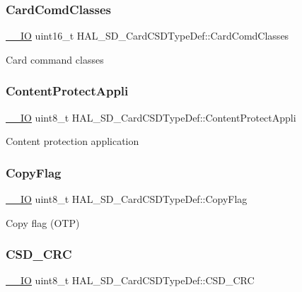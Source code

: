 \subsubsection{\texorpdfstring{CardComdClasses}{CardComdClasses}}
{\footnotesize\ttfamily \mbox{\hyperlink{core__sc300_8h_aec43007d9998a0a0e01faede4133d6be}{\+\_\+\+\_\+\+IO}} uint16\+\_\+t H\+A\+L\+\_\+\+S\+D\+\_\+\+Card\+C\+S\+D\+Type\+Def\+::\+Card\+Comd\+Classes}

Card command classes \mbox{\label{struct_h_a_l___s_d___card_c_s_d_type_def_a6bacd6337e20ac7647c6f1996ae1581f}} 
\subsubsection{\texorpdfstring{ContentProtectAppli}{ContentProtectAppli}}
{\footnotesize\ttfamily \mbox{\hyperlink{core__sc300_8h_aec43007d9998a0a0e01faede4133d6be}{\+\_\+\+\_\+\+IO}} uint8\+\_\+t H\+A\+L\+\_\+\+S\+D\+\_\+\+Card\+C\+S\+D\+Type\+Def\+::\+Content\+Protect\+Appli}

Content protection application \mbox{\label{struct_h_a_l___s_d___card_c_s_d_type_def_a85841cbabdbfc1d6808aba01db946727}} 
\subsubsection{\texorpdfstring{CopyFlag}{CopyFlag}}
{\footnotesize\ttfamily \mbox{\hyperlink{core__sc300_8h_aec43007d9998a0a0e01faede4133d6be}{\+\_\+\+\_\+\+IO}} uint8\+\_\+t H\+A\+L\+\_\+\+S\+D\+\_\+\+Card\+C\+S\+D\+Type\+Def\+::\+Copy\+Flag}

Copy flag (O\+TP) \mbox{\label{struct_h_a_l___s_d___card_c_s_d_type_def_aac6c59f0170b6603b4ba95b46aab3dbf}} 
\subsubsection{\texorpdfstring{CSD\_CRC}{CSD\_CRC}}
{\footnotesize\ttfamily \mbox{\hyperlink{core__sc300_8h_aec43007d9998a0a0e01faede4133d6be}{\+\_\+\+\_\+\+IO}} uint8\+\_\+t H\+A\+L\+\_\+\+S\+D\+\_\+\+Card\+C\+S\+D\+Type\+Def\+::\+C\+S\+D\+\_\+\+C\+RC}

